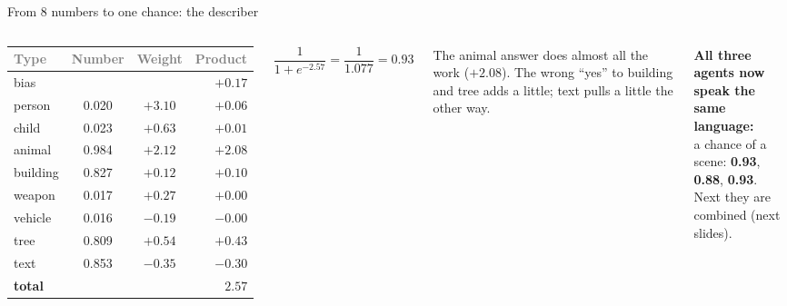 \documentclass[aspectratio=169,11pt]{beamer}
\renewcommand{\arraystretch}{1.3}
\newcommand{\h}[1]{\textcolor{grey}{#1}}
\begin{document}
\begin{frame}{From 8 numbers to one chance: the describer}
\begin{columns}[T]
\footnotesize\renewcommand{\arraystretch}{1.12}
\begin{tabular}{@{}l c c r@{}}
\toprule
\h{Type} & \h{Number} & \h{Weight} & \h{Product}\\
\midrule
bias & & & $+0.17$\\
person & 0.020 & $+3.10$ & $+0.06$\\
child & 0.023 & $+0.63$ & $+0.01$\\
animal & 0.984 & $+2.12$ & $\mathbf{+2.08}$\\
building & 0.827 & $+0.12$ & $+0.10$\\
weapon & 0.017 & $+0.27$ & $+0.00$\\
vehicle & 0.016 & $-0.19$ & $-0.00$\\
tree & 0.809 & $+0.54$ & $+0.43$\\
text & 0.853 & $-0.35$ & $-0.30$\\
\midrule
\textbf{total} & & & $\mathbf{2.57}$\\
\bottomrule
\end{tabular}
\[ \frac{1}{1 + e^{-2.57}} = \frac{1}{1.077} = \mathbf{0.93} \]

\vspace{0.2cm}
The animal answer does almost all the work ($+2.08$). The wrong ``yes'' to building and tree adds a little; text pulls a little the other way.

\vspace{0.3cm}
\textbf{All three agents now speak the same language:}\\
a chance of a scene: \textbf{0.93}, \textbf{0.88}, \textbf{0.93}.\\
Next they are combined (next slides).
\end{columns}
\end{frame}
\end{document}
